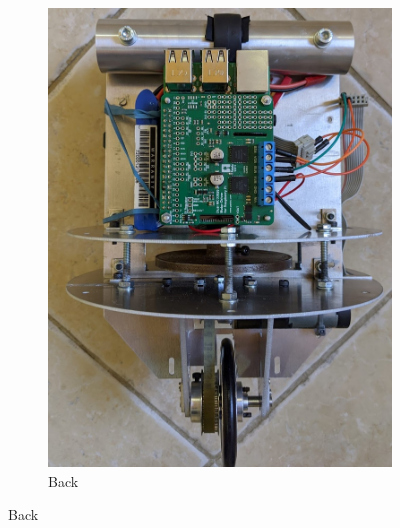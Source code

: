 \documentclass[twoside,twocolumn,12pt]{article}
\begin{document}
\begin{figure}[ht!]
\begin{subfigure}[t]{0.325\textwidth}
    \includegraphics[width=\linewidth]{backnew}
    \caption{Back}
  \label{sub:backnew}
  \end{subfigure}
  \newline
  

\end{figure}
\end{document}
